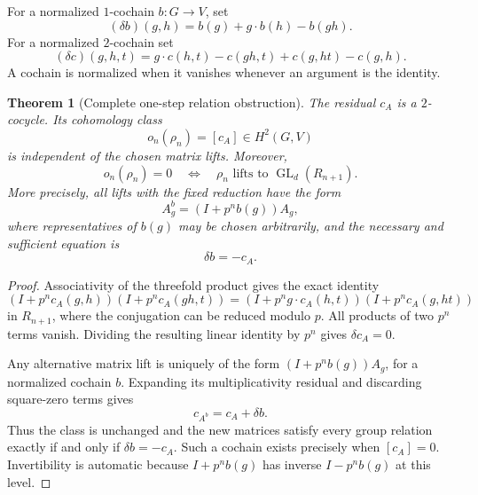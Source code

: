\documentclass[11pt]{article}
\newtheorem{theorem}{Theorem}[section]
\theoremstyle{definition}
\theoremstyle{remark}
\begin{document}
For a normalized $1$-cochain $b:G\to V$, set
\[
 (\delta b)(g,h)=b(g)+g\cdot b(h)-b(gh).
\]
For a normalized $2$-cochain set
\[
 (\delta c)(g,h,t)=g\cdot c(h,t)-c(gh,t)+c(g,ht)-c(g,h).
\]
A cochain is normalized when it vanishes whenever an argument is the identity.

\begin{theorem}[Complete one-step relation obstruction]\label{thm:relation-H2}
The residual $c_A$ is a $2$-cocycle. Its cohomology class
\[
 o_n(\rho_n)=[c_A]\in H^2(G,V)
\]
is independent of the chosen matrix lifts. Moreover,
\[
 \boxed{o_n(\rho_n)=0
 \quad\Longleftrightarrow\quad
 \rho_n\text{ lifts to }\operatorname{GL}_d(R_{n+1}).}
\]
More precisely, all lifts with the fixed reduction have the form
\[
 A_g^b=(I+p^n b(g))A_g,
\]
where representatives of $b(g)$ may be chosen arbitrarily, and the necessary and sufficient equation is
\[
 \boxed{\delta b=-c_A.}
\]
\end{theorem}
\begin{proof}
Associativity of the threefold product gives the exact identity
\[
 (I+p^nc_A(g,h))(I+p^nc_A(gh,t))
 = (I+p^n g\cdot c_A(h,t))(I+p^nc_A(g,ht))
\]
in $R_{n+1}$, where the conjugation can be reduced modulo $p$. All products of two $p^n$ terms vanish. Dividing the resulting linear identity by $p^n$ gives $\delta c_A=0$.

Any alternative matrix lift is uniquely of the form $(I+p^nb(g))A_g$, for a normalized cochain $b$. Expanding its multiplicativity residual and discarding square-zero terms gives
\[
 c_{A^b}=c_A+\delta b.
\]
Thus the class is unchanged and the new matrices satisfy every group relation exactly if and only if $\delta b=-c_A$. Such a cochain exists precisely when $[c_A]=0$. Invertibility is automatic because $I+p^nb(g)$ has inverse $I-p^nb(g)$ at this level.
\end{proof}
\end{document}
